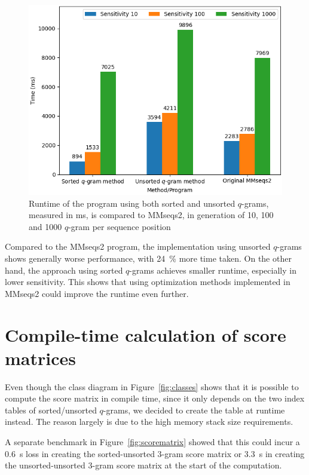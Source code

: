 \documentclass[twoside,a4paper,bsc]{master}
\newcommand{\Qgram}[1]{\(#1\)-gram}
\begin{document}
\begin{figure}
\centering
\includegraphics[scale=0.6]{graphics/mmseqs2comp.png}
\caption{Runtime of the program using both sorted and unsorted \Qgram{q}s,
measured in ms, is compared to MMseqs2, in generation of 10, 100 and 1000
\Qgram{q} per sequence position}
\label{fig:mmseqs2comp}
\end{figure}

Compared to the MMseqs2 program, the implementation using unsorted
\Qgram{q}s
shows generally worse performance, with 24~\% more time taken. On the other
hand,
the approach using sorted \Qgram{q}s achieves smaller runtime, especially
in
lower sensitivity. This shows that using optimization methods implemented
in MMseqs2 could improve the runtime even further.

\section{Compile-time calculation of
score matrices\label{section:scorematrix}}
Even though the class diagram in Figure~\ref{fig:classes} shows that it is
possible to compute the score matrix in compile time, since it only depends
on the two index tables of sorted/unsorted \Qgram{q}s, we decided to create 
the table at runtime instead. The reason largely is due
to the high memory stack size requirements.

A separate benchmark in
Figure~\ref{fig:scorematrix} showed that this could incur a 0.6~s loss in
creating the sorted-unsorted \Qgram{3} score matrix or 3.3~s in creating
the unsorted-unsorted \Qgram{3} score matrix at the start of the
computation.
\end{document}
